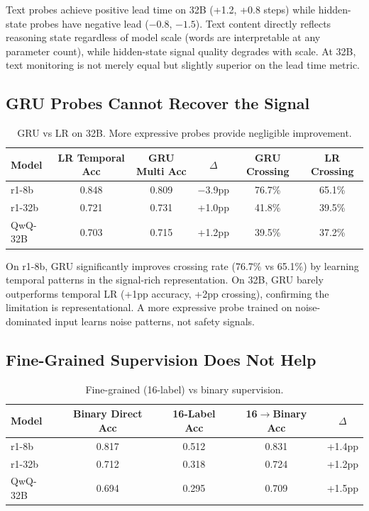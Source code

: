 \documentclass[11pt]{article}
\begin{document}
Text probes achieve positive lead time on 32B (+1.2, +0.8 steps) while hidden-state probes have negative lead ($-0.8$, $-1.5$). Text content directly reflects reasoning state regardless of model scale (words are interpretable at any parameter count), while hidden-state signal quality degrades with scale. At 32B, text monitoring is not merely equal but slightly superior on the lead time metric.

\subsection{GRU Probes Cannot Recover the Signal}

\begin{table}[h]
\centering
\caption{GRU vs LR on 32B. More expressive probes provide negligible improvement.}
\label{tab:gru}
\small
\begin{tabular}{lccccc}
\toprule
Model & LR Temporal Acc & GRU Multi Acc & $\Delta$ & GRU Crossing & LR Crossing \\
\midrule
r1-8b & 0.848 & 0.809 & $-$3.9pp & 76.7\% & 65.1\% \\
r1-32b & 0.721 & 0.731 & +1.0pp & 41.8\% & 39.5\% \\
QwQ-32B & 0.703 & 0.715 & +1.2pp & 39.5\% & 37.2\% \\
\bottomrule
\end{tabular}
\end{table}

On r1-8b, GRU significantly improves crossing rate (76.7\% vs 65.1\%) by learning temporal patterns in the signal-rich representation. On 32B, GRU barely outperforms temporal LR (+1pp accuracy, +2pp crossing), confirming the limitation is representational. A more expressive probe trained on noise-dominated input learns noise patterns, not safety signals.

\subsection{Fine-Grained Supervision Does Not Help}

\begin{table}[h]
\centering
\caption{Fine-grained (16-label) vs binary supervision.}
\label{tab:taxonomy}
\small
\begin{tabular}{lcccc}
\toprule
Model & Binary Direct Acc & 16-Label Acc & 16$\to$Binary Acc & $\Delta$ \\
\midrule
r1-8b & 0.817 & 0.512 & 0.831 & +1.4pp \\
r1-32b & 0.712 & 0.318 & 0.724 & +1.2pp \\
QwQ-32B & 0.694 & 0.295 & 0.709 & +1.5pp \\
\bottomrule
\end{tabular}
\end{table}
\end{document}
